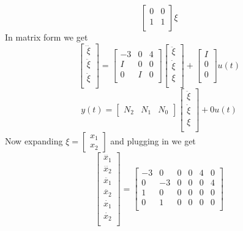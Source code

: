 \documentclass{article}
\begin{document}
\begin{enumerate}[(a)]
$$\begin{bmatrix}
0 & 0 \\
1 & 1 \\
\end{bmatrix}
\xi
$$
In matrix form we get
$$
\begin{bmatrix}
\dddot{\xi} \\
\ddot{\xi} \\
\dot{\xi} \\
\end{bmatrix}
=
\begin{bmatrix}
-3 & 0 & 4 \\
I & 0 & 0 \\
0 & I & 0 \\
\end{bmatrix}
\begin{bmatrix}
\ddot{\xi} \\
\dot{\xi} \\
\xi \\
\end{bmatrix}
+
\begin{bmatrix}
I \\
0 \\
0 \\
\end{bmatrix}
u(t)
$$
$$
y(t) =
\begin{bmatrix}
N_2 & N_1 & N_0
\end{bmatrix}
\begin{bmatrix}
\ddot{\xi} \\
\dot{\xi} \\
\xi \\
\end{bmatrix}
+
0 u(t)
$$
Now expanding $\xi = \begin{bmatrix} x_1 \\ x_2 \end{bmatrix}$ and plugging in we get
$$
\begin{bmatrix}
\dddot{x_1} \\
\dddot{x_2} \\
\ddot{x_1} \\
\ddot{x_2} \\
\dot{x_1} \\
\dot{x_2} \\
\end{bmatrix}
=
\begin{bmatrix}
-3 &  0 & 0 & 0 & 4 & 0 \\
 0 & -3 & 0 & 0 & 0 & 4 \\
 1 &  0 & 0 & 0 & 0 & 0 \\
 0 &  1 & 0 & 0 & 0 & 0 \\

\end{bmatrix}$$
\end{enumerate}
\end{document}
